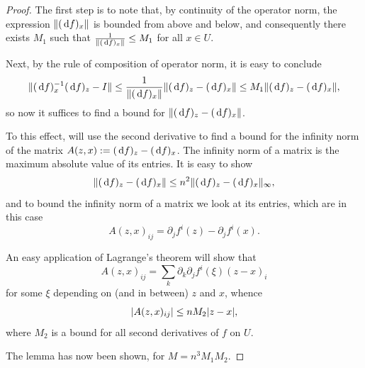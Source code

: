 \documentclass{article}
\theoremstyle{nonumberplain}
\newtheorem{proof}{Proof}
\DeclarePairedDelimiter{\norm}{\lvert}{\rvert}
\DeclarePairedDelimiter{\Norm}{\lVert}{\rVert}
\begin{document}
\begin{proof}
The first step is to note that, by continuity of the operator norm, the expression $\Norm{(\dl f)_x}$ is bounded from above and below, and consequently there exists $M_1$ such that $\frac1{\Norm{(\dl f)_x}} \leq M_1$ for all $x \in U$.

Next, by the rule of composition of operator norm, it is easy to conclude
\[\Norm{(\dl f)_x^{-1} (\dl f)_{z} - I} \leq \frac1{\Norm{(\dl f)_x}} \Norm{(\dl f)_{z} - (\dl f)_x} \leq M_1 \Norm{(\dl f)_{z} - (\dl f)_x},\]
so now it suffices to find a bound for $\Norm{(\dl f)_{z} - (\dl f)_x}$.

To this effect, will use the second derivative to find a bound for the infinity norm of the matrix $A(z,x) := (\dl f)_{z} - (\dl f)_x$. The infinity norm of a matrix is the maximum absolute value of its entries. It is easy to show
\[\Norm{(\dl f)_{z} - (\dl f)_x} \leq n^2 \Norm{(\dl f)_{z} - (\dl f)_x}_\infty,\]
and to bound the infinity norm of a matrix we look at its entries, which are in this case
\[A(z,x)_{ij} = \partial_j f^i(z) - \partial_j f^i(x).\]

An easy application of Lagrange's theorem will show that
\[A(z,x)_{ij} = \sum_k \partial_k \partial_j f^i(\xi) (z-x)_i\]
for some $\xi$ depending on (and in between) $z$ and $x$, whence
\[\norm{A(z,x)_{ij}} \leq n M_2 \norm{z-x},\]
where $M_2$ is a bound for all second derivatives of $f$ on $U$.

The lemma has now been shown, for $M = n^3 M_1 M_2$. 
\end{proof}
\end{document}
